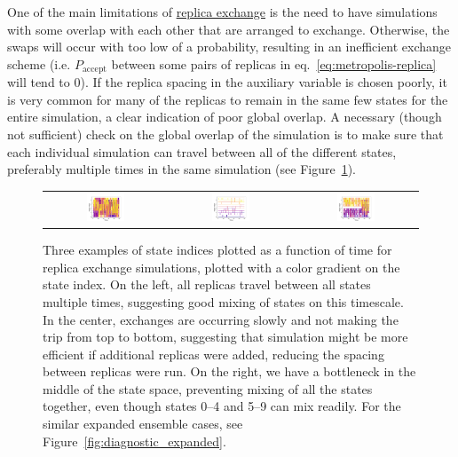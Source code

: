 \documentclass[9pt,review]{livecoms}
\begin{document}
One of the main limitations of \hyperlink{ref:ReplEx} {replica exchange} is the need to have simulations with some overlap with each other that are arranged to exchange. Otherwise, the swaps will occur with too low of a probability, resulting in an inefficient exchange scheme (i.e. $P_\mathrm{accept}$ between some pairs of replicas in eq.~\ref{eq:metropolis-replica} will tend to $0$). If the replica spacing in the auxiliary variable is chosen poorly, it is very common for many of the replicas to remain in the same few states for the entire simulation, a clear indication of poor global overlap. A necessary (though not sufficient) check on the global overlap of the simulation is to make sure that each individual simulation can travel between all of the different states, preferably multiple times in the same simulation (see Figure~\ref{fig:diagnostic_replica}).

\begin{figure}[!ht]
    \centering
\begin{tabular}{c|c|c}
\includegraphics[width=0.33\textwidth]{Figures/diagnostic_figures/goodmixing.png} & \includegraphics[width=0.33\textwidth]{Figures/diagnostic_figures/slowmixing.png}&
\includegraphics[width=0.33\textwidth]{Figures/diagnostic_figures/sepmixing.png}
\end{tabular}
    \caption{Three examples of state indices plotted as a function of time for replica exchange simulations, plotted with a color gradient on the state index.  On the left, all replicas travel between all states multiple times, suggesting good mixing of states on this timescale.  In the center, exchanges are occurring slowly and not making the trip from top to bottom, suggesting that simulation might be more efficient if additional replicas were added, reducing the spacing between replicas were run. On the right, we have a bottleneck in the middle of the state space, preventing mixing of all the states together, even though states 0--4 and 5--9 can mix readily. For the similar expanded ensemble cases, see Figure~\ref{fig:diagnostic_expanded}.}
    \label{fig:diagnostic_replica}
\end{figure}
\end{document}
